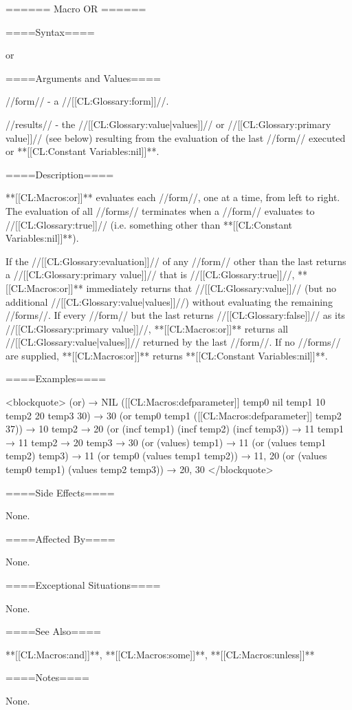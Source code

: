 ====== Macro OR ======

====Syntax====

\DefmacWithValues or {} {}

====Arguments and Values====

//form// - a //[[CL:Glossary:form]]//.

//results// - the //[[CL:Glossary:value|values]]// or //[[CL:Glossary:primary value]]// (see below) resulting from the evaluation of the last //form// executed or **[[CL:Constant Variables:nil]]**.

====Description====

**[[CL:Macros:or]]** evaluates each //form//, one at a time, from left to right. The evaluation of all //forms// terminates when a //form// evaluates to //[[CL:Glossary:true]]// (i.e. something other than **[[CL:Constant Variables:nil]]**).

If the //[[CL:Glossary:evaluation]]// of any //form// other than the last returns a //[[CL:Glossary:primary value]]// that is //[[CL:Glossary:true]]//, **[[CL:Macros:or]]** immediately returns that //[[CL:Glossary:value]]// (but no additional //[[CL:Glossary:value|values]]//) without evaluating the remaining //forms//. If every //form// but the last returns //[[CL:Glossary:false]]// as its //[[CL:Glossary:primary value]]//, **[[CL:Macros:or]]** returns all //[[CL:Glossary:value|values]]// returned by the last //form//. If no //forms// are supplied, **[[CL:Macros:or]]** returns **[[CL:Constant Variables:nil]]**.

====Examples====

<blockquote> (or) → NIL ([[CL:Macros:defparameter]] temp0 nil temp1 10 temp2 20 temp3 30) → 30 (or temp0 temp1 ([[CL:Macros:defparameter]] temp2 37)) → 10 temp2 → 20 (or (incf temp1) (incf temp2) (incf temp3)) → 11 temp1 → 11 temp2 → 20 temp3 → 30 (or (values) temp1) → 11 (or (values temp1 temp2) temp3) → 11 (or temp0 (values temp1 temp2)) → 11, 20 (or (values temp0 temp1) (values temp2 temp3)) → 20, 30 </blockquote>

====Side Effects====

None.

====Affected By====

None.

====Exceptional Situations====

None.

====See Also====

**[[CL:Macros:and]]**, **[[CL:Macros:some]]**, **[[CL:Macros:unless]]**

====Notes====

None.

